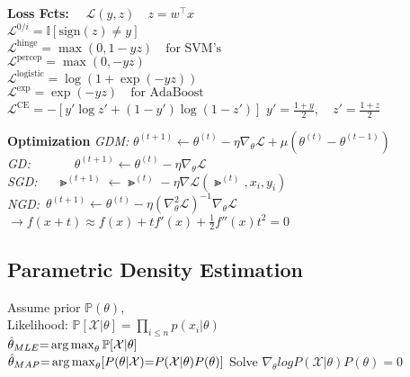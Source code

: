 \textbf{Loss Fcts:} 
$\quad \mathcal{L}(y, z) \quad z{=} w^\top x$ \\
$\mathcal{L}^{0/i} = \mathbb{I}[\text{sign}(z) \neq y]$ \\
$\mathcal{L}^{\text{hinge}} = \max(0, 1 - yz) \quad \text{for SVM's} $\\
$\mathcal{L}^{\text{percep}} = \max(0, -yz) $\\
$\mathcal{L}^{\text{logistic}} = \log(1 + \exp(-yz)) $\\
$\mathcal{L}^{\text{exp}} = \exp(-yz) \quad \text{for AdaBoost}$ \\
$\mathcal{L}^{\text{CE}} = -[y' \log z' + (1 - y') \log (1 - z')] $
$y' = \frac{1+y}{2}, \quad z' = \frac{1+z}{2}$


\textbf{Optimization} 
\textit{GDM:}
$\theta^{(t{+}1)}{\leftarrow}\theta^{(t)}{-}\eta\nabla_{\theta}\mathcal{L}{{+}}\mu(\theta^{(t)}{-}\theta^{(t{-}1)})$
\textit{GD:}\ \ \ \ \ \ \ 
$\theta^{(t{+}1)}{\leftarrow}\theta^{(t)}{-}\eta\nabla_{\theta}\mathcal{L}$\\
\textit{SGD:}\ \ \ 
$\Gt^{(t{+}1)} {\leftarrow} \Gt^{(t)} {-} \eta \nabla \mathcal{L}(\Gt^{(t)}, x_i, y_i)$ \\
\textit{NGD:}\ 
$\theta^{(t{+}1)}{\leftarrow}\theta^{(t)}{-}\eta(\nabla^2_{\theta}\mathcal{L})^{-1}\nabla_{\theta}\mathcal{L}$\\
${\rightarrow}f(x{+}t){\approx}f(x){+}t f'(x){+}\frac{1}{2}f''(x)t^2 {=} 0$

\subsection*{Parametric Density Estimation}
Assume prior $\mathbb{P}(\theta)$,  \\
Likelihood: $\mathbb{P}[\mathcal{X}|\theta]=\prod_{i\leq n}p(x_i|\theta)$\\
$\hat{\theta}_{MLE} {=} \operatorname*{arg\,max}_\theta \mathbb{P}[\mathcal{X}|\theta]$ \\
$\hat{\theta}_{MAP} {=} \operatorname*{arg\,max}_\theta [P(\theta|\mathcal{X}) {=} P(\mathcal{X}|\theta)P(\theta)]$
Solve $\nabla_\theta log P(\mathcal{X}|\theta)P(\theta)=0$


